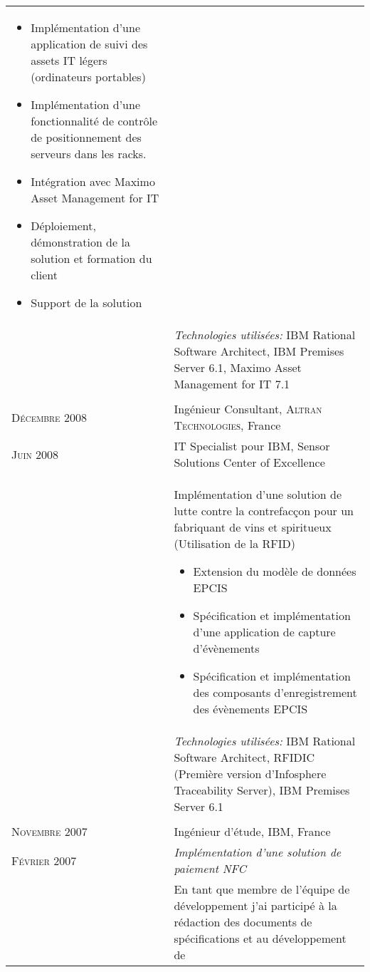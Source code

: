 \begin{longtable}{R{2.5cm}|p{14.8cm}}
{\begin{itemize}
 		  	\item Implémentation d'une application de suivi des assets IT légers (ordinateurs portables)
 		  	\item Implémentation d'une fonctionnalité de contrôle de positionnement des serveurs dans les racks.
 		  	\item Intégration avec Maximo Asset Management for IT
			\item Déploiement, démonstration de la solution et formation du client
			\item Support de la solution
		\end{itemize}
		\vspace{-1em}
 	}\\&
 \footnotesize{\emph{Technologies utilisées:} IBM Rational Software Architect, IBM Premises Server 6.1, Maximo Asset Management for IT 7.1 }\\ 	
   \\
 	\textsc{Décembre 2008} & Ingénieur Consultant, \textsc{Altran Technologies}, France\\
 	\textsc{Juin 2008}& IT Specialist pour IBM, Sensor Solutions Center of Excellence\\&
 	\footnotesize{
 	 	Implémentation d'une solution de lutte contre la contrefacçon pour un fabriquant de vins et spiritueux (Utilisation de la RFID)
 		\begin{itemize}
 		  	\item Extension du modèle de données EPCIS
 		  	\item Spécification et implémentation d'une application de capture d'évènements
 		  	\item Spécification et implémentation des  composants d'enregistrement des évènements EPCIS
		\end{itemize}
		\vspace{-1em}
 	}\\&
 \footnotesize{\emph{Technologies utilisées:} IBM Rational Software Architect, RFIDIC (Première version d'Infosphere Traceability Server), IBM Premises Server 6.1 }\\
 \\
 	\textsc{Novembre 2007} & Ingénieur d'étude, \textsc{IBM}, France \\
 	\textsc{Février 2007}&\emph{Implémentation d'une solution de paiement NFC}\\&
 	\footnotesize{
 	 	En tant que membre de l'équipe de développement j'ai
 		participé à la rédaction des documents de spécifications et au développement de
}
\end{longtable}
